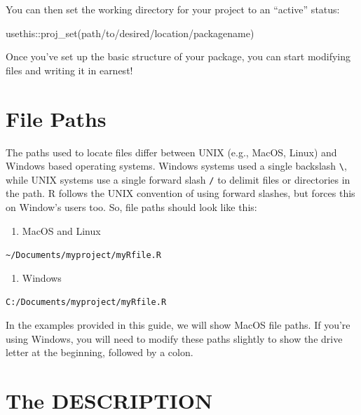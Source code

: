 \documentclass[
]{book}
\newenvironment{Shaded}{\begin{snugshade}}{\end{snugshade}}
\newcommand{\FunctionTok}[1]{\textcolor[rgb]{0.00,0.00,0.00}{#1}}
\newcommand{\NormalTok}[1]{#1}
\newcommand{\SpecialCharTok}[1]{\textcolor[rgb]{0.00,0.00,0.00}{#1}}
\newcommand{\StringTok}[1]{\textcolor[rgb]{0.31,0.60,0.02}{#1}}
\providecommand{\tightlist}{%
  \setlength{\itemsep}{0pt}\setlength{\parskip}{0pt}}
\begin{document}
You can then set the working directory for your project to an ``active'' status:

\begin{Shaded}
\begin{Highlighting}[]
\NormalTok{usethis}\SpecialCharTok{::}\FunctionTok{proj\_set}\NormalTok{(}\StringTok{\textquotesingle{}path/to/desired/location/packagename\textquotesingle{}}\NormalTok{)}
\end{Highlighting}
\end{Shaded}

Once you've set up the basic structure of your package, you can start modifying files and writing it in earnest!

\hypertarget{file-paths}{%
\section{File Paths}\label{file-paths}}

The paths used to locate files differ between UNIX (e.g., MacOS, Linux) and Windows based operating systems. Windows systems used a single backslash \texttt{\textbackslash{}}, while UNIX systems use a single forward slash \texttt{/} to delimit files or directories in the path. R follows the UNIX convention of using forward slashes, but forces this on Window's users too. So, file paths should look like this:

\begin{enumerate}
\def\labelenumi{\arabic{enumi}.}
\tightlist
\item
  MacOS and Linux
\end{enumerate}

\texttt{\textasciitilde{}/Documents/myproject/myRfile.R}

\begin{enumerate}
\def\labelenumi{\arabic{enumi}.}
\setcounter{enumi}{1}
\tightlist
\item
  Windows
\end{enumerate}

\texttt{C:/Documents/myproject/myRfile.R}

In the examples provided in this guide, we will show MacOS file paths. If you're using Windows, you will need to modify these paths slightly to show the drive letter at the beginning, followed by a colon.

\hypertarget{the-description}{%
\section{The DESCRIPTION}\label{the-description}}
\end{document}
